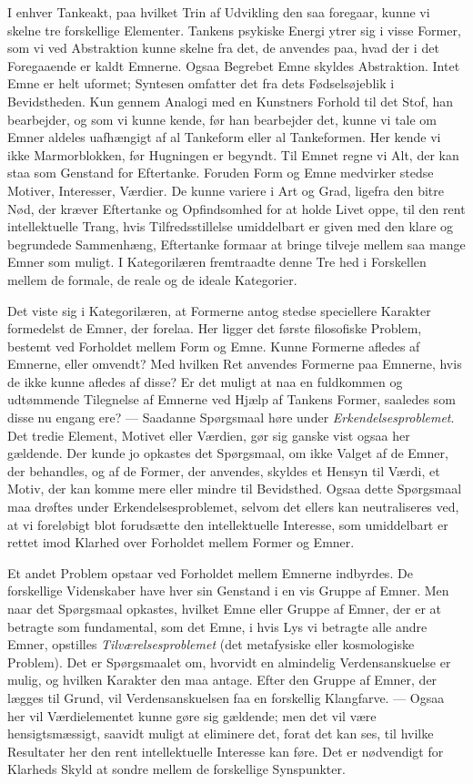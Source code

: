 \documentclass[12pt,a4paper]{book}
\newcommand{\opage}[1]{\marginnote{\footnotesize\textit{[#1]}}}
\begin{document}
I enhver Tankeakt, paa hvilket Trin af Udvikling den saa foregaar, kunne vi skelne
tre forskellige Elementer. Tankens psykiske Energi ytrer sig i visse Former, som vi
ved Abstraktion kunne skelne fra det, de anvendes paa, hvad der i det Foregaaende
er kaldt Emnerne. Ogsaa Begrebet Emne skyldes Abstraktion. Intet Emne er helt
uformet; Syntesen omfatter det fra dets Fødselsøjeblik i Bevidstheden. Kun gennem
Analogi med en Kunstners Forhold til det Stof, han bearbejder, og som vi kunne
kende, før han bearbejder det, kunne vi tale om Emner aldeles uafhængigt af al
Tankeform eller al Tankeformen. Her kende vi ikke Marmorblokken, før Hugningen er
begyndt. Til Emnet regne vi Alt, der kan staa som Genstand for Eftertanke. Foruden
Form og Emne medvirker stedse Motiver, Interesser, Værdier. De kunne variere i Art
og Grad, ligefra den bitre Nød, der kræver Eftertanke og Opfindsomhed for at holde
Livet oppe, til den rent intellektuelle Trang, hvis Tilfredsstillelse umiddelbart
er given med den klare og begrundede Sammenhæng, Eftertanke formaar at bringe
tilveje mellem saa mange Emner som muligt. I Kategorilæren fremtraadte denne
Tre%
\opage{249}hed i Forskellen mellem de formale, de reale og de ideale Kategorier.

Det viste sig i Kategorilæren, at Formerne antog stedse speciellere Karakter
formedelst de Emner, der forelaa. Her ligger det første filosofiske Problem,
bestemt ved Forholdet mellem Form og Emne. Kunne Formerne afledes af Emnerne,
eller omvendt? Med hvilken Ret anvendes Formerne paa Emnerne, hvis de ikke kunne
afledes af disse? Er det muligt at naa en fuldkommen og udtømmende Tilegnelse af
Emnerne ved Hjælp af Tankens Former, saaledes som disse nu engang ere? ---
Saadanne Spørgsmaal høre under \emph{Erkendelsesproblemet}. Det tredie Element,
Motivet eller Værdien, gør sig ganske vist ogsaa her gældende. Der kunde jo
opkastes det Spørgsmaal, om ikke Valget af de Emner, der behandles, og af de
Former, der anvendes, skyldes et Hensyn til Værdi, et Motiv, der kan komme mere
eller mindre til Bevidsthed. Ogsaa dette Spørgsmaal maa drøftes under
Erkendelsesproblemet, selvom det ellers kan neutraliseres ved, at vi foreløbigt
blot forudsætte den intellektuelle Interesse, som umiddelbart er rettet imod
Klarhed over Forholdet mellem Former og Emner.

Et andet Problem opstaar ved Forholdet mellem Emnerne indbyrdes. De forskellige
Videnskaber have hver sin Genstand i en vis Gruppe af Emner. Men naar det
Spørgsmaal opkastes, hvilket Emne eller Gruppe af Emner, der er at betragte som
fundamental, som det Emne, i hvis Lys vi betragte alle andre Emner, opstilles
\emph{Tilværelsesproblemet} (det metafysiske eller kosmologiske Problem). Det er
Spørgsmaalet om, hvorvidt en almindelig Verdensanskuelse er mulig, og hvilken
Karakter den maa antage. Efter den Gruppe af Emner, der lægges til Grund, vil
Verdensanskuelsen faa en forskellig Klangfarve. --- Ogsaa her vil Værdielementet
kunne gøre sig gældende; men det vil være hensigtsmæssigt, saavidt muligt at
eliminere det, forat det kan ses, til hvilke Resultater her den rent intellektuelle
Interesse kan føre. Det er nødvendigt for Klarheds Skyld at sondre mellem de
forskellige Synspunkter.
\end{document}

